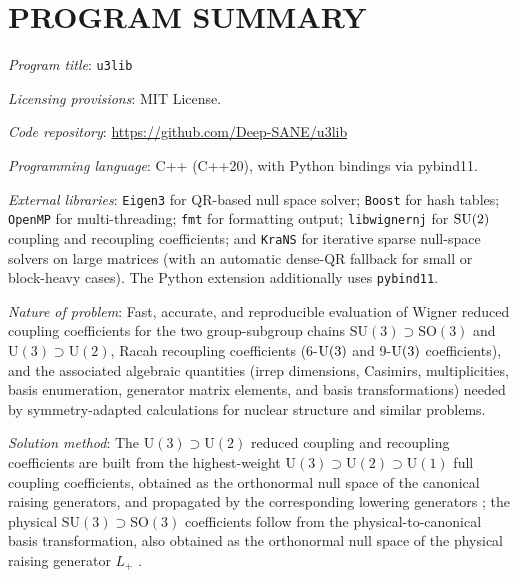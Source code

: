 \documentclass[aps,onecolumn,10pt,superscriptaddress,floatfix,nofootinbib]{revtex4}
\begin{document}
\maketitle

\section*{PROGRAM SUMMARY}
\noindent
\textit{Program title}: \texttt{u3lib}

\noindent
\textit{Licensing provisions}: MIT License.

\noindent
\textit{Code repository}: \url{https://github.com/Deep-SANE/u3lib}

\noindent
\textit{Programming language}: C++ (C++20), with Python bindings via pybind11.

\noindent
\textit{External libraries}: \texttt{Eigen3} for QR-based null space solver; \texttt{Boost} for hash tables;
\texttt{OpenMP} for multi-threading; \texttt{fmt} for formatting output; \texttt{libwignernj} for $\rm SU(2)$ coupling
and recoupling coefficients; and \texttt{KraNS} for iterative sparse null-space solvers on large matrices
(with an automatic dense-QR fallback for small or block-heavy cases).
The Python extension additionally uses \texttt{pybind11}.

\noindent
\textit{Nature of problem}: Fast, accurate, and reproducible evaluation of 
Wigner reduced coupling coefficients for the two group-subgroup chains
$\mathrm{SU(3)}\supset\mathrm{SO(3)}$ and
$\mathrm{U(3)}\supset\mathrm{U(2)}$, Racah
recoupling coefficients (6-$\rm U(3)$ and 9-$\rm U(3)$ coefficients), and
the associated algebraic quantities (irrep dimensions, Casimirs, multiplicities, 
basis enumeration, generator matrix elements, and basis transformations) needed by 
symmetry-adapted calculations for nuclear structure and similar problems.

\noindent
\textit{Solution method}: The $\mathrm{U(3)}\supset\mathrm{U(2)}$ reduced coupling and 
recoupling coefficients are built from the highest-weight $\mathrm{U(3)}\supset\mathrm{U(2)} \supset\mathrm{U(1)}$ 
full coupling coefficients, obtained as the orthonormal null space of the canonical raising generators, 
and propagated by the corresponding lowering generators \cite{Dang2024EPJP1}; 
the physical $\mathrm{SU(3)}\supset\mathrm{SO(3)}$ coefficients follow from the physical-to-canonical
basis transformation, also obtained as the orthonormal null space of the physical raising generator $L_+$ \cite{Dang2024EPJP1}.
\end{document}
